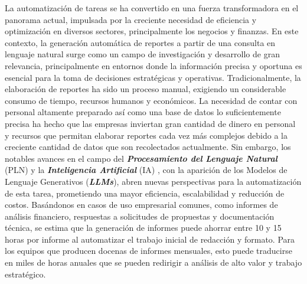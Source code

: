 La automatización de tareas se ha convertido en una fuerza transformadora en el panorama actual, impulsada por la creciente necesidad de eficiencia y optimización en diversos sectores, principalmente los negocios y finanzas. En este contexto, la generación automática de reportes a partir de una consulta en lenguaje natural surge como un campo de investigación y desarrollo de gran relevancia, principalmente en entornos donde la información precisa y oportuna es esencial para la toma de decisiones estratégicas y operativas.
Tradicionalmente, la elaboración de reportes ha sido un proceso manual, exigiendo un considerable consumo de tiempo, recursos humanos y económicos. La necesidad de contar con personal altamente preparado así como una base de datos lo suficientemente precisa ha hecho que las empresas inviertan gran cantidad de dinero en personal y recursos que permitan elaborar reportes cada vez más complejos debido a la creciente cantidad de datos que son recolectados actualmente. Sin embargo, los notables avances en el campo del \textit{\textbf{Procesamiento del Lenguaje Natural}} (PLN) y la \textit{\textbf{Inteligencia Artificial}} (IA) \cite{russell2010artificial}, con la aparición de los Modelos de Lenguaje Generativos (\textit{\textbf{LLMs}}), abren nuevas perspectivas para la automatización de esta tarea, prometiendo una mayor eficiencia, escalabilidad y reducción de costos.
Basándonos en casos de uso empresarial comunes, como informes de análisis financiero, respuestas a solicitudes de propuestas y documentación técnica, se estima que la generación de informes puede ahorrar entre 10 y 15 horas por informe al automatizar el trabajo inicial de redacción y formato. Para los equipos que producen docenas de informes mensuales, esto puede traducirse en miles de horas anuales que se pueden redirigir a análisis de alto valor y trabajo estratégico.

